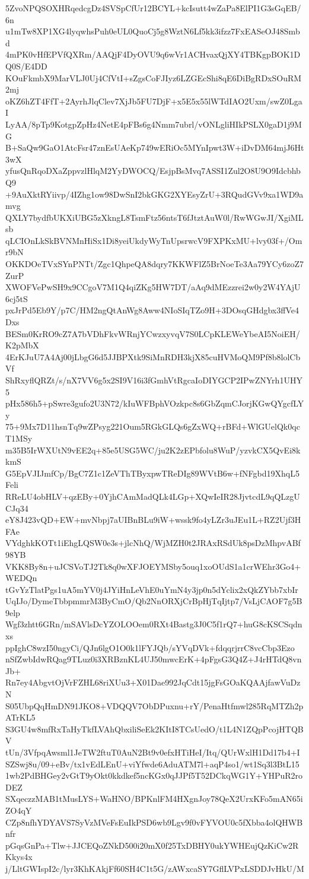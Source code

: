 5ZvoNPQSOXHRqedcgDz4SVSpCfUr12BCYL+kcIsutt4wZaPa8ElPI1G3sGqEB/6n
u1mTw8XP1XG4lyqwhsPuh0eUL0QuoCj5g8WztN6Lf5kk3ifzz7FxEASeOJ48Smbd
4mPK0vHfEPVfQXRm/AAQjF4DyOVU9q6wVr1ACHvaxQjXY4TBKgpBOK1DQ0S/E4DD
KOuFkmbX9MarVLJ0Uj4CfVtI+sZgsCoFJIyz6LZGEcShi8qE6DiBgRDxSOuRM2mj
oKZ6hZT4FfT+2AyrhJlqClev7XjJb5FU7DjF+x5E5x55lWTdIAO2Uxm/swZ0LgaI
LyAA/8pTp9KotgpZpHz4NetE4pFBs6g4Nmm7ubrl/vONLgliHIkPSLX0gaD1j9MG
B+SaQw9GaO1AtcFsr47znEsUAeKp749wERiOc5MYnIpwt3W+iDvDM64mjJ6Ht3wX
yfusQnRqoDXaZppvzlHlqM2YyDWOCQ/EsjpBsMvq7ASSI1Zul2O8U9O9IdcbhbQ9
+9AuXktRYiivp/4IZhg1ow98DwSnI2bkGKG2XYEsyZrU+3RQudGVv9xa1WD9amvg
QXLY7bydfbUKXiUBG5zXkngL8TsmFtz56ntsT6fJtztAuW0l/RwWGwJI/XgiMLsb
qLCIOnLkSkBVNMnHiSx1Di8yeiUkdyWyTnUpsrwcV9FXPKxMU+lvy03f+/Omr9bN
OKKDOeTVxSYnPNTt/Zgc1QhpeQA8dqry7KKWFlZ5BrNoeTe3Aa79YCy6zoZ7ZurP
XWOFVePwSH9x9CCgoV7M1Q4qiZKg5HW7DT/aAq9dMEzzrei2w0y2W4YAjU6cj5tS
pxJrPd5Eb9Y/p7C/HM2ngQtAnWg8Aww4NIoSIqTZo9H+3DOsqGHdgbx3ffVe4Dxs
BESm0KrRO9cZ7A7bVDhFkvWRnjYCwzxyvqV7S0LCpKLEWeYbeAI5NoiEH/K2pMbX
4ErKJuU7A4Aj00jLbgG6d5JJBPXtk9SiMnRDH3kjX85cuHVMoQM9Pf8b8lolCbVf
ShRxyflQRZt/s/nX7VV6g5x2SI9V16i3fGmhVtRgcaIoDIYGCP2IPwZNYrh1UHY5
pHx586h5+pSwre3gufo2U3N72/kIuWFBphVOzkpc8s6GbZqmCJorjKGwQYgcfLYy
75+9Mx7D11hsnTq9wZPsyg221Oum5RGkGLQs6gZxWQ+rBFd+WlGUelQk0qcT1MSy
m35B5IrWXUtN9vEE2q+85e5USG5WC/ju2K2zEPbfolu8WuP/yzvkCX5QvEi8kkmS
G5EpVJIJmfCp/BgC7Z1c1ZeVThTByxpwTReDIg89WVtB6w+fNFgbd19XhqL5Feli
RReLU4obHLV+qzEBy+0YjhCAmMadQLk4LGp+XQwIeIR28JjvtcdL9qQLzgUCJq34
eY8J423vQD+EW+mvNbpj7aUIBnBLu9iW+wssk9fo4yLZr3uJEu1L+RZ2Ujf3HFAe
VYdghkKOTt1iEhgLQSW0e3s+jlcNhQ/WjMZH0t2JRAxRSdUk8psDzMhpvABf98YB
VKK8By8n+uJCSVoTJ2Tk8q0wXFJOEYMSby5ouq1xoOUdS1a1crWEhr3Go4+WEDQn
tGvYzTlatPgs1uA5mYV0j4JYiHnLeVhE0uYmN4y3jp0n5dYclix2xQkZYbb7xbIr
UqIJo/DymeTbbpmmrM3ByCmO/Qb2NnORXjCrBpHjTqIjtp7/VsLjCAOF7g5B9elp
Wgf3zhtt6GRn/mSAVlsDcYZOLOOem0RXt4Bastg3J0C5f1rQ7+huG8cKSCSqdnxs
ppIghC8wzI50ngyCi/QJn6lgO1O0k1lFYJQb/sYVqDVk+fdqqrjrrC8vcCbp3Ezo
nSfZwbIdwRQag9TLuz0i3XRBznKL4UJ50mwcErK+4pFgsG3Q4Z+J4rHTdQ8vnJb+
Rn7ey4AbgvtOjVrFZHL68riXUu3+X01Dae992JqCdt15jgFsGOaKQAAjfawVuDzN
S05UbpQqHmDN91JKO8+VDQQV7ObDPuxnu+rY/PenaHtfmwl285RqMTZh2pATrKL5
S3GU4w8mfRxTaHyTkfLVAhQbxiliSeEk2KItI8TCsUedO/t1L4N1ZQpPcojHTQBV
tUn/3VfpqAwsml1JeTW2ftuT0AuN2Bt9v0efxHTiHeI/Itq/QUrWxlH1Dd17b4+I
SZSwj8u/09+eBv/tx1vEdLEnU+viYfwde6AduATM7l+aqP4so1/wt1Sq3l3BtL15
1wb2PdBHGey2vGtT9yOkt0kkdkef5ncKGx0qJJPf5T52DCkqWG1Y+YHPuR2roDEZ
SXqeczzMAB1tMusLYS+WaHNO/BPKnlFM4HXgnJoy78QeX2UrxKFo5mAN65iZO4qY
CZp8nfhYDYAVS7SyVzMVeFsEuIkPSD6wb9Lgv9f0vFYVOU0c5fXbba4olQHWBnfr
pGqsGnPa+Tlw+JJCEQoZNkD500i20mX0f25TxDBHY0ukYWHEujQzKiCw2RKkys4x
j/LltGWIspI2c/lyr3KhKAkjFf60SH4C1t5G/zAWxcaSY7GflLVPxLSDDJvHkU/M
